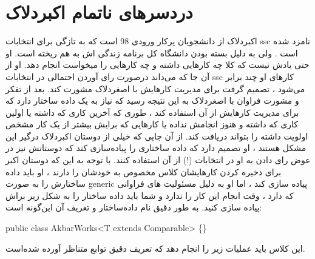 \documentclass[]{article}
\begin{document}
\section{دردسرهای ناتمام اکبردلاک}
اکبردلاک از دانشجویان پرکار ورودی 98 است که به تازگی برای انتخابات ssc نامزد شده است . ولی به دلیل بسته بودن دانشگاه کل برنامه زندگی اش به هم ریخته است. او حتی یادش نیست که کلا چه کارهایی داشته و چه کارهایی را میخواست انجام دهد. او از آن جا که می‌داند درصورت رای آوردن احتمالی در انتخابات ssc کارهای او چند برابر می‌شود ، تصمیم گرفت برای مدیریت کارهایش با اصغردلاک مشورت کند. بعد از تفکر و مشورت فراوان با اصغردلاک به این نتیجه رسید که نیاز به یک داده ساختار دارد که برای مدیریت کارهایش از آن استفاده کند ، طوری که آخرین کاری که داشته یا اولین کاری که داشته و هنوز انجامش نداده یا کارهایی که برایش بیشتر از یک کار مشخص اولویت داشته را بتواند دریافت کند. از آن جایی که خیلی از دوستان اکبردلاک درگیر این مشکل هستند ، او تصمیم دارد که داده ساختاری را پیاده‌سازی کند که دوستانش نیز در عوض رای دادن به او در انتخابات (!) از آن استفاده کنند. با توجه به این که دوستان اکبر برای ذخیره کردن کارهایشان کلاس مخصوص به خودشان را دارند ، او باید داده ساختارش را به صورت generic پیاده سازی کند ، اما او به دلیل مسئولیت های فراوانی که دارد ، وقت انجام این کار را ندارد و شما باید داده ساختار را به شکل زیر براش پیاده سازی کنید. به طور دقیق نام داده‌ساختار و تعریف آن این‌گونه است:\\
\begin{tcolorbox}[boxrule=0pt]
	\begin{latin}
  	  \large{
  	  	public class AkbarWorks<T extends Comparable> \{\}
		}
	\end{latin}
\end{tcolorbox}
این کلاس باید عملیات زیر را انجام دهد که تعریف دقیق توابع متناظر آورده شده‌است.
\end{document}
